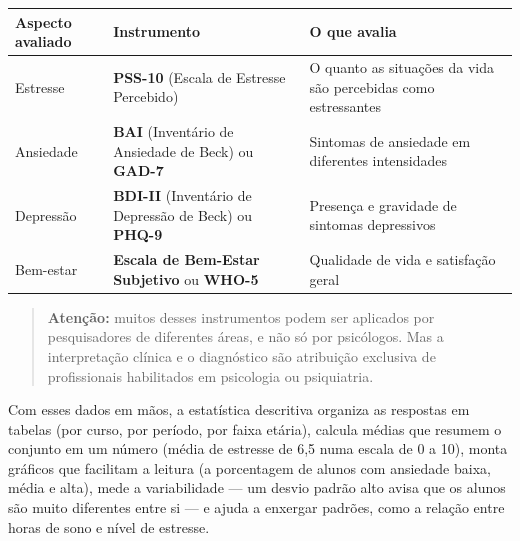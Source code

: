 \documentclass[
]{book}
\newcounter{none} %
\begin{document}
{\def\LTcaptype{none} %
\begin{longtable}[]{@{}
  >{\raggedright\arraybackslash}p{}
  >{\raggedright\arraybackslash}p{}
  >{\raggedright\arraybackslash}p{}@{}}
\toprule\noalign{}
\begin{minipage}[b]{\linewidth}\raggedright
Aspecto avaliado
\end{minipage} & \begin{minipage}[b]{\linewidth}\raggedright
Instrumento
\end{minipage} & \begin{minipage}[b]{\linewidth}\raggedright
O que avalia
\end{minipage} \\
\midrule\noalign{}
\endhead
\bottomrule\noalign{}
\endlastfoot
Estresse & \textbf{PSS-10} (Escala de Estresse Percebido) & O quanto as situações da vida são percebidas como estressantes \\
Ansiedade & \textbf{BAI} (Inventário de Ansiedade de Beck) ou \textbf{GAD-7} & Sintomas de ansiedade em diferentes intensidades \\
Depressão & \textbf{BDI-II} (Inventário de Depressão de Beck) ou \textbf{PHQ-9} & Presença e gravidade de sintomas depressivos \\
Bem-estar & \textbf{Escala de Bem-Estar Subjetivo} ou \textbf{WHO-5} & Qualidade de vida e satisfação geral \\
\end{longtable}
}

\begin{quote}
\textbf{Atenção:} muitos desses instrumentos podem ser aplicados por pesquisadores de diferentes áreas, e não só por psicólogos. Mas a interpretação clínica e o diagnóstico são atribuição exclusiva de profissionais habilitados em psicologia ou psiquiatria.
\end{quote}

Com esses dados em mãos, a estatística descritiva organiza as respostas em tabelas (por curso, por período, por faixa etária), calcula médias que resumem o conjunto em um número (média de estresse de 6,5 numa escala de 0 a 10), monta gráficos que facilitam a leitura (a porcentagem de alunos com ansiedade baixa, média e alta), mede a variabilidade --- um desvio padrão alto avisa que os alunos são muito diferentes entre si --- e ajuda a enxergar padrões, como a relação entre horas de sono e nível de estresse.
\end{document}
